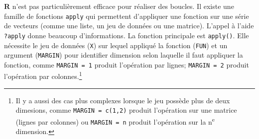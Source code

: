 \documentclass[
]{book}
\begin{document}
\textbf{R} n'est pas particulièrement efficace pour réaliser des boucles. Il existe une famille de fonctions \texttt{apply} qui permettent d'appliquer une fonction sur une série de vecteurs (comme une liste, un jeu de données ou une matrice). L'appel à l'aide \texttt{?apply} donne beaucoup d'informations. La fonction principale est \texttt{apply()}. Elle nécessite le jeu de données (\texttt{X}) sur lequel appliqué la fonction (\texttt{FUN}) et un argument (\texttt{MARGIN}) pour identifier dimension selon laquelle il faut appliquer la fonction, comme \texttt{MARGIN\ =\ 1} produit l'opération par lignes; \texttt{MARGIN\ =\ 2} produit l'opération par colonnes.\footnote{Il y a aussi des cas plus complexes lorsque le jeu possède plus de deux dimesions, comme \texttt{MARGIN\ =\ c(1,2)} produit l'opération sur une matrice (lignes par colonnes) ou \texttt{MARGIN\ =\ n} produit l'opération sur la n\textsuperscript{e} dimension.}
\end{document}
